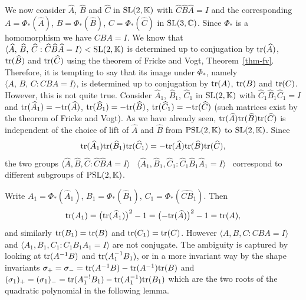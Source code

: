 \documentclass[11pt]{amsart}
\numberwithin{equation}{section}
\begin{document}
\medskip
 
We now consider $\widehat{A}$, $\widehat{B}$ and $\widehat{C}$ in ${\rm SL}(2,{\mathbb K})$ with 
$\widehat{C}\widehat{B}\widehat{A}=I$ 
and the corresponding $A=\Phi_*(\widehat{A})$, $B=\Phi_*(\widehat{B})$, $C=\Phi_*(\widehat{C})$ in
${\rm SL}(3,{\mathbb C})$. Since $\Phi_*$ is a homomorphism we have $CBA=I$.  We know that 
$\langle \widehat{A},\, \widehat{B},\, \widehat{C} : \widehat{C}\widehat{B}\widehat{A}=I\rangle <{\rm SL}(2,{\mathbb K})$
is determined up to conjugation by ${\rm tr}(\widehat{A})$,  ${\rm tr}(\widehat{B})$ and ${\rm tr}(\widehat{C})$ using 
the theorem of Fricke and Vogt, Theorem~\ref{thm-fv}. Therefore, it is tempting to say that its image under $\Phi_*$, 
namely $\langle A,\,B,\,C : CBA=I\rangle$, is determined up to conjugation by ${\rm tr}(A)$, ${\rm tr}(B)$ and ${\rm tr}(C)$. 
However, this is not quite true. Consider $\widehat{A}_1$, $\widehat{B}_1$, $\widehat{C}_1$ in ${\rm SL}(2,{\mathbb K})$
with $\widehat{C}_1\widehat{B}_1\widehat{C}_1=I$ and ${\rm tr}(\widehat{A}_1)=-{\rm tr}(\widehat{A})$, 
${\rm tr}(\widehat{B}_1)=-{\rm tr}(\widehat{B})$, ${\rm tr}(\widehat{C}_1)=-{\rm tr}(\widehat{C})$ (such matrices exist by
the theorem of Fricke and Vogt). As we have already seen, 
${\rm tr}(\widehat{A}){\rm tr}(\widehat{B}){\rm tr}(\widehat{C})$ is independent of the choice of lift of $\widehat{A}$ and 
$\widehat{B}$ from ${\rm PSL}(2,{\mathbb K})$ to ${\rm SL}(2,{\mathbb K})$. Since
$$
{\rm tr}(\widehat{A}_1){\rm tr}(\widehat{B}_1){\rm tr}(\widehat{C}_1)
=-{\rm tr}(\widehat{A}){\rm tr}(\widehat{B}){\rm tr}(\widehat{C}),
$$
the two groups
$\langle \widehat{A},\widehat{B},\widehat{C} :\widehat{C}\widehat{B}\widehat{A}=I\rangle$ \
$\langle \widehat{A}_1,\widehat{B}_1,\widehat{C}_1 :\widehat{C}_1\widehat{B}_1\widehat{A}_1=I\rangle$ \
correspond to different subgroups of ${\rm PSL}(2,{\mathbb K})$. 

Write $A_1=\Phi_*(\widehat{A}_1)$, $B_1=\Phi_*(\widehat{B}_1)$, $C_1=\Phi_*(\widehat{CB}_1)$. Then 
$$
{\rm tr}(A_1)=\bigl({\rm tr}(\widehat{A}_1)\bigr)^2-1
=\bigl(-{\rm tr}(\widehat{A})\bigr)^2-1={\rm tr}(A),
$$
and similarly ${\rm tr}(B_1)={\rm tr}(B)$ and ${\rm tr}(C_1)={\rm tr}(C)$. However 
$\langle A,B,C : CBA=I\rangle$ and $\langle A_1,B_1,C_1 : C_1B_1A_1=I\rangle$ are not conjugate.
The ambiguity is captured by
looking at ${\rm tr}(A^{-1}B)$ and ${\rm tr}(A_1^{-1}B_1)$, or in a more invariant way by the shape invariants
$\sigma_+=\sigma_-={\rm tr}(A^{-1}B)-{\rm tr}(A^{-1}){\rm tr}(B)$ and 
$(\sigma_1)_+=(\sigma_1)_-={\rm tr}(A_1^{-!}B_1)-{\rm tr}(A_1^{-1}){\rm tr}(B_1)$ which are the two roots of the 
quadratic polynomial in the following lemma.
\end{document}
